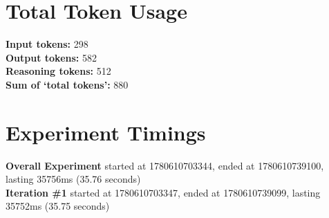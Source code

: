 \documentclass{article}
\begin{document}
\section*{Total Token Usage}
\textbf{Input tokens: }298
\\\textbf{Output tokens: }582
\\\textbf{Reasoning tokens: }512
\\\textbf{Sum of `total tokens': }880
\section*{Experiment Timings}
\textbf{Overall Experiment} started at 1780610703344, ended at 1780610739100, lasting 35756ms (35.76 seconds)
\\\textbf{Iteration \#1} started at 1780610703347, ended at 1780610739099, lasting 35752ms (35.75 seconds)
\end{document}
